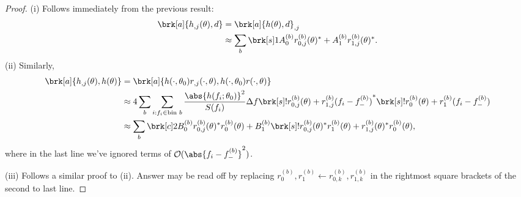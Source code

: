 \begin{proof}
(i) Follows immediately from the previous result:
\begin{align*}
\brk[a]{h_{,j}(\theta), d} &= \brk[a]{h(\theta), d}_{,j} \\
&\approx \sum_b \brk[s]1{A_0^{(b)} r_{0,j}^{(b)}(\theta)^* + A_1^{(b)} r_{1,j}^{(b)}(\theta)^*}.
\end{align*}
(ii) Similarly,
\begin{align*}
\brk[a]{h_{,j}(\theta), h(\theta)} &= \brk[a]{h(\cdot,\theta_0) r_{,j}(\cdot,\theta), h(\cdot,\theta_0) r(\cdot,\theta)}\\
&\approx 4 \sum_b \sum_{i:f_i \in \text{bin } b}\frac{\abs{h(f_i;\theta_0)}^2}{S(f_i)}\Delta f \brk[s]!{r_{0,j}^{(b)}(\theta) + r_{1,j}^{(b)}(f_i-f_-^{(b)})}^* \brk[s]!{r_{0}^{(b)}(\theta) + r_{1}^{(b)}(f_i-f_-^{(b)})} \\
&\approx \sum_b \brk[c]2{B_0^{(b)} r_{0,j}^{(b)}(\theta)^* r_0^{(b)}(\theta) + B_1^{(b)} \brk[s]!{r_{0,j}^{(b)}(\theta)^* r_1^{(b)}(\theta) + r_{1,j}^{(b)}(\theta)^* r_0^{(b)}(\theta)}},
\end{align*}
where in the last line we've ignored terms of $\order(\abs{f_i - f_-^{(b)}}^2)$.

(iii) Follows a similar proof to (ii). Answer may be read off by replacing $r_0^{(b)}, r_1^{(b)} \leftarrow r_{0,k}^{(b)}, r_{1,k}^{(b)}$ in the rightmost square brackets of the second to last line.
\end{proof}
